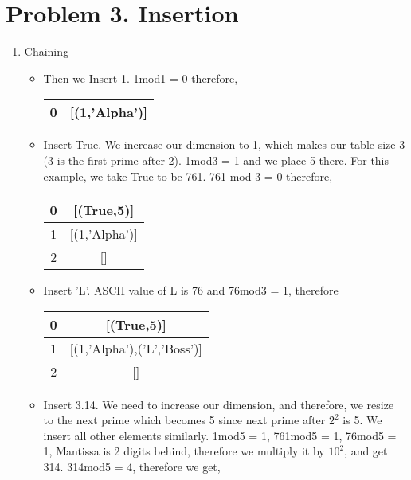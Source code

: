 \documentclass{article}
\begin{document}
	\section*{Problem 3. Insertion}
	\begin{enumerate}
		\item Chaining\\
		\begin{itemize}
		Initially, we begin by choosing dimension 0, making the size of our table 1 (1 is prime).:
		\begin{center}
		\begin{tabular}{ |c|c| } 
			\hline
			 0 &  [] \\ 
			\hline
		\end{tabular}
		\end{center}
		\item Then we Insert 1. 1mod1 = 0 therefore,
		\begin{center}
			\begin{tabular}{ |c|c| } 
				\hline
				0 & [(1,'Alpha')]  \\ 
				\hline
			\end{tabular}
		\end{center}
		\item Insert True. We increase our dimension to 1, which makes our table size 3 (3 is the first prime after 2). 1mod3 = 1 and we place 5 there. For this example, we take True to be 761. 761 mod 3 = 0 therefore,
		\begin{center}
			\begin{tabular}{ |c|c| } 
				\hline
				0 & [(True,5)]   \\ 
				\hline
				1 &	[(1,'Alpha')] \\
				\hline 
				2 &  [] \\ 
				\hline
			\end{tabular}
		\end{center}
		\item Insert 'L'. ASCII value of L is 76 and 76mod3 = 1, therefore
		\begin{center}
			\begin{tabular}{ |c|c| } 
				\hline
				0 & [(True,5)]   \\ 
				\hline
				1 &	[(1,'Alpha'),('L','Boss')] \\
				\hline 
				2 & []  \\ 
				\hline
				\end{tabular}
		\end{center}
		\item  Insert 3.14. We need to increase our dimension, and therefore, we resize to the next prime which becomes 5 since next prime after $2^2$ is 5. We insert all other elements similarly. 1mod5 = 1, 761mod5 = 1, 76mod5 = 1,  Mantissa is 2 digits behind, therefore we multiply it by $10^2$, and get 314. 314mod5 = 4, therefore we get,

\end{itemize}
\end{enumerate}
\end{document}
